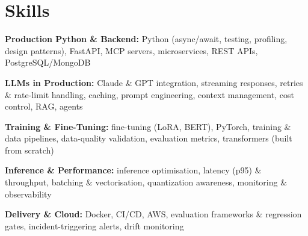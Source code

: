 \documentclass[10pt,a4paper]{article}
\begin{document}
\section{Skills}
\begin{tight}
  \item[\textcolor{accent}{\small$\bullet$}] \textbf{Production Python \& Backend:} Python (async/await, testing, profiling, design patterns), FastAPI, MCP servers, microservices, REST APIs, PostgreSQL/MongoDB
  \item[\textcolor{accent}{\small$\bullet$}] \textbf{LLMs in Production:} Claude \& GPT integration, streaming responses, retries \& rate-limit handling, caching, prompt engineering, context management, cost control, RAG, agents
  \item[\textcolor{accent}{\small$\bullet$}] \textbf{Training \& Fine-Tuning:} fine-tuning (LoRA, BERT), PyTorch, training \& data pipelines, data-quality validation, evaluation metrics, transformers (built from scratch)
  \item[\textcolor{accent}{\small$\bullet$}] \textbf{Inference \& Performance:} inference optimisation, latency (p95) \& throughput, batching \& vectorisation, quantization awareness, monitoring \& observability
  \item[\textcolor{accent}{\small$\bullet$}] \textbf{Delivery \& Cloud:} Docker, CI/CD, AWS, evaluation frameworks \& regression gates, incident-triggering alerts, drift monitoring
\end{tight}

\end{document}
